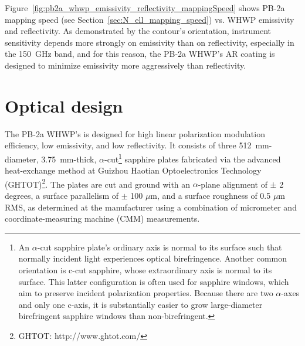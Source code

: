 Figure~\ref{fig:pb2a_whwp_emissivity_reflectivity_mappingSpeed} shows PB-2a mapping speed (see Section~\ref{sec:N_ell_mapping_speed}) vs. WHWP emissivity and reflectivity. As demonstrated by the contour's orientation, instrument sensitivity depends more strongly on emissivity than on reflectivity, especially in the 150~GHz band, and for this reason, the PB-2a WHWP's AR coating is designed to minimize emissivity more aggressively than reflectivity.


\section{Optical design}
\label{sec:pb2a_whwp_optical_design}

The PB-2a WHWP's  is designed for high linear polarization modulation efficiency, low emissivity, and low reflectivity. It consists of three 512~mm-diameter, 3.75~mm-thick, $\alpha$-cut\footnote{An $\alpha$-cut sapphire plate's ordinary axis is normal to its surface such that normally incident light experiences optical birefringence. Another common orientation is c-cut sapphire, whose extraordinary axis is normal to its surface. This latter configuration is often used for sapphire windows, which aim to preserve incident polarization properties. Because there are two $\alpha$-axes and only one c-axis, it is substantially easier to grow large-diameter birefringent sapphire windows than non-birefringent.} sapphire plates fabricated via the advanced heat-exchange method at Guizhou Haotian Optoelectronics Technology (GHTOT)\footnote{GHTOT: http://www.ghtot.com/}. The plates are cut and ground with an $\alpha$-plane alignment of $\pm$ 2 degrees, a surface parallelism of $\pm$ 100 $\mu$m, and a surface roughness of 0.5 $\mu$m RMS, as determined at the manufacturer using a combination of micrometer and coordinate-measuring machine (CMM) measurements.

